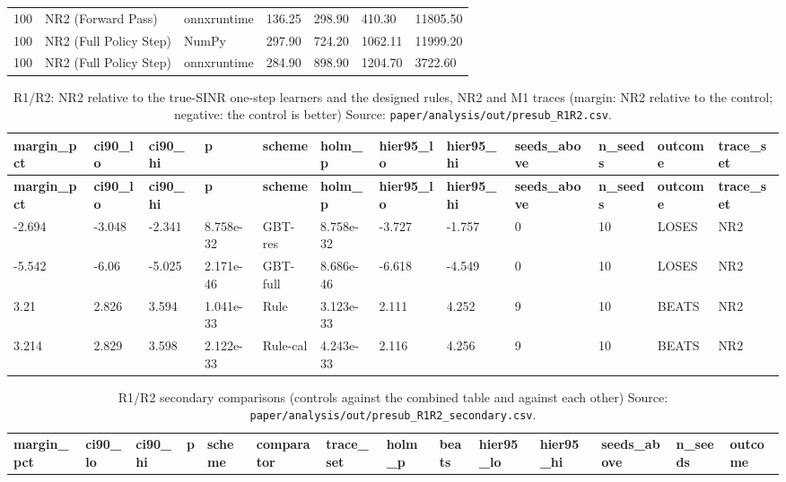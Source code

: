 \documentclass[10pt]{article}
\begin{document}
\begin{landscape}
\begin{longtable}{@{}lllllll@{}}
100 & NR2 (Forward Pass) & onnxruntime & 136.25 & 298.90 & 410.30 & 11805.50 \\
100 & NR2 (Full Policy Step) & NumPy & 297.90 & 724.20 & 1062.11 & 11999.20 \\
100 & NR2 (Full Policy Step) & onnxruntime & 284.90 & 898.90 & 1204.70 & 3722.60 \\
\bottomrule
\end{longtable}
\normalsize
\tiny
\setlength{\tabcolsep}{2pt}
\begin{longtable}{@{}llllllllllll@{}}
\caption{R1/R2: NR2 relative to the true-SINR one-step learners and the designed rules, NR2 and M1 traces (margin: NR2 relative to the control; negative: the control is better) Source: \texttt{paper/analysis/out/presub\_R1R2.csv}.}\\
\toprule
\textbf{margin\_pct} & \textbf{ci90\_lo} & \textbf{ci90\_hi} & \textbf{p} & \textbf{scheme} & \textbf{holm\_p} & \textbf{hier95\_lo} & \textbf{hier95\_hi} & \textbf{seeds\_above} & \textbf{n\_seeds} & \textbf{outcome} & \textbf{trace\_set} \\
\midrule
\endfirsthead
\toprule
\textbf{margin\_pct} & \textbf{ci90\_lo} & \textbf{ci90\_hi} & \textbf{p} & \textbf{scheme} & \textbf{holm\_p} & \textbf{hier95\_lo} & \textbf{hier95\_hi} & \textbf{seeds\_above} & \textbf{n\_seeds} & \textbf{outcome} & \textbf{trace\_set} \\
\midrule
\endhead
-2.694 & -3.048 & -2.341 & 8.758e-32 & GBT-res & 8.758e-32 & -3.727 & -1.757 & 0 & 10 & LOSES & NR2 \\
-5.542 & -6.06 & -5.025 & 2.171e-46 & GBT-full & 8.686e-46 & -6.618 & -4.549 & 0 & 10 & LOSES & NR2 \\
3.21 & 2.826 & 3.594 & 1.041e-33 & Rule & 3.123e-33 & 2.111 & 4.252 & 9 & 10 & BEATS & NR2 \\
3.214 & 2.829 & 3.598 & 2.122e-33 & Rule-cal & 4.243e-33 & 2.116 & 4.256 & 9 & 10 & BEATS & NR2 \\
\bottomrule
\end{longtable}
\normalsize
\tiny
\setlength{\tabcolsep}{2pt}
\begin{longtable}{@{}llllllllllllll@{}}
\caption{R1/R2 secondary comparisons (controls against the combined table and against each other) Source: \texttt{paper/analysis/out/presub\_R1R2\_secondary.csv}.}\\
\toprule
\textbf{margin\_pct} & \textbf{ci90\_lo} & \textbf{ci90\_hi} & \textbf{p} & \textbf{scheme} & \textbf{comparator} & \textbf{trace\_set} & \textbf{holm\_p} & \textbf{beats} & \textbf{hier95\_lo} & \textbf{hier95\_hi} & \textbf{seeds\_above} & \textbf{n\_seeds} & \textbf{outcome} \\

\end{longtable}
\end{landscape}
\end{document}

